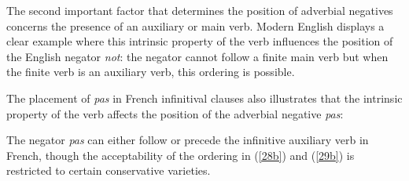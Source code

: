 \documentclass[output=paper]{langsci/langscibook}
\begin{document}
{\begin{exe}
\begin{xlist}
\pfix
\pfix\pfix

\begin{exe}
\ex\label{fr-fin-neg} \begin{xlist}
\zl



%
%
%
%
%

The second important factor that determines the position of adverbial
negatives concerns the presence of an auxiliary or main verb.
Modern English displays a clear example where this
intrinsic property of the verb influences the position of
the English negator \textit{not}: the negator cannot follow
a finite main verb but when the finite verb is an auxiliary verb,
this ordering is possible.

\eal
{}
\zl

\noindent
The placement of \textit{pas} in French infinitival
clauses also illustrates that the intrinsic property of
the verb affects the position of the adverbial negative \textit{pas}:

\eal
{}
 \label{28b}
\zl

\eal
{}
 \label{29b}
\zl

\noindent
The negator \textit{pas} can either follow or precede the infinitive
auxiliary verb in French, though the acceptability of the
ordering in (\ref{28b}) and (\ref{29b}) is restricted to certain conservative
varieties.



%



\end{xlist}
\end{exe}
\end{xlist}
\end{exe}}
\end{document}
